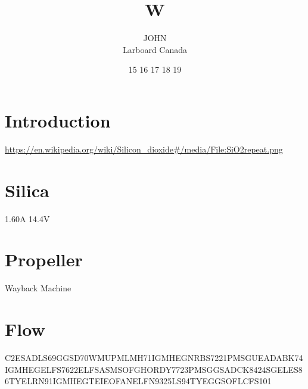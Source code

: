 \documentclass{article}
\title{W}
\author{
  \parbox{0.3\linewidth}{\centering JOHN\\Larboard Canada}
  }
\date{15 16 17 18 19}
\begin{document}
\maketitle

\section{Introduction}
\url{https://en.wikipedia.org/wiki/Silicon_dioxide#/media/File:SiO2repeat.png}

\section{Silica}
1.60A 14.4V

\section{Propeller}
Wayback Machine

\section{Flow}
C2ESADLS69GGSD70WMUPMLMH71IGMHEGNRBS7221PMSGUEADABK74IGMHEGELFS7622ELFSASMSOFGHORDY7723PMSGGSADCK8424SGELES86TYELRN91IGMHEGTEIEOFANELFN9325LS94TYEGGSOFLCFS101



\end{document}

